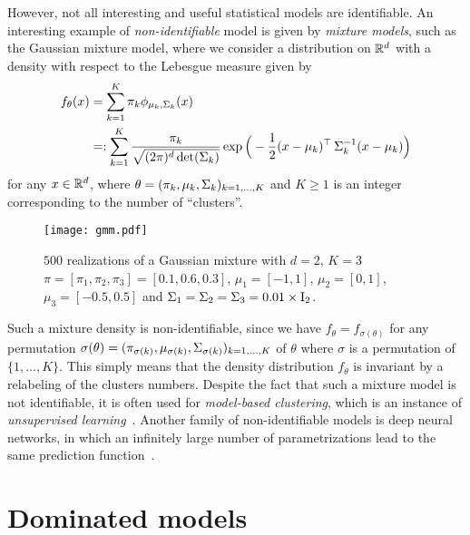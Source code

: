 However, not all interesting and useful statistical models are identifiable. 
An interesting example of \emph{non-identifiable} model is given by \emph{mixture models}, such as the Gaussian mixture model, where we consider a distribution on $\mathbb R^d$ with a density with respect to the Lebesgue measure given by 
%
\begin{align*}
	f_\theta(x) &= \sum_{k=1}^K \pi_k \phi_{\mu_k, \operatorname{\boldsymbol \Sigma}_k}(x) \\ 
	&=: \sum_{k=1}^K \frac{\pi_k }{\sqrt{(2 \pi)^d \det (\operatorname{\boldsymbol \Sigma}_k)}} 
	\exp\Big( -\frac 12 (x - \mu_k)^\top \operatorname{\boldsymbol \Sigma}_k^{-1} (x - \mu_k) \Big)
\end{align*}
for any $x \in \mathbb R^d$, where $\theta = (\pi_k, \mu_k, \operatorname{\boldsymbol \Sigma}_k)_{k=1, \ldots, K}$ and $K \geq 1$ is an integer corresponding to the number of ``clusters''.
\begin{figure}[htbp]
	\texttt{[image: gmm.pdf]}
	\caption{$500$ realizations of a Gaussian mixture with $d=2$, $K=3$ $\pi = [\pi_1, \pi_2, \pi_3] = [0.1, 0.6, 0.3]$, $\mu_1 = [-1, 1]$, $\mu_2 = [0, 1]$, $\mu_3 = [-0.5, 0.5]$ and $\operatorname{\boldsymbol \Sigma}_1 = \operatorname{\boldsymbol \Sigma}_2 = \operatorname{\boldsymbol \Sigma}_3 = 0.01 \times \operatorname{{\boldsymbol I}}_2$.}
\end{figure}
Such a mixture density is non-identifiable, since we have $f_{\theta} = f_{\sigma(\theta)}$
for any permutation $\sigma(\theta) = (\pi_{\sigma(k)}, \mu_{\sigma(k)}, \operatorname{\boldsymbol \Sigma}_{\sigma(k)})_{k=1, \ldots, K}$ of $\theta$ where $\sigma$ is a permutation of $\{1, \ldots, K \}$.
This simply means that the density distribution $f_\theta$ is invariant by a relabeling of the clusters numbers.
Despite the fact that such a mixture model is not identifiable, it is often used for \emph{model-based clustering}, which is an instance of \emph{unsupervised learning}~.
Another family of non-identifiable models is deep neural networks, in which an infinitely large number of parametrizations lead to the same prediction function~.

\section{Dominated models} 

